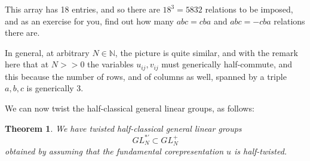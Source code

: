 \documentclass[12pt]{amsbook}
\newtheorem{theorem}{Theorem}[chapter]
\begin{document}
This array has 18 entries, and so there are $18^3=5832$ relations to be imposed, and as an exercise for you, find out how many $abc=cba$ and $abc=-cba$ relations there are.

\bigskip

In general, at arbitrary $N\in\mathbb N$, the picture is quite similar, and with the remark here that at $N>>0$ the variables $u_{ij},v_{ij}$ must generically half-commute, and this because the number of rows, and of columns as well, spanned by a triple $a,b,c$ is generically 3.

\bigskip

We can now twist the half-classical general linear groups, as follows:


\begin{theorem}
We have twisted half-classical general linear groups
$$GL_N^{*\prime}\subset GL_N^+$$
obtained by assuming that the fundamental corepresentation $u$ is half-twisted.
\end{theorem}
\end{document}
